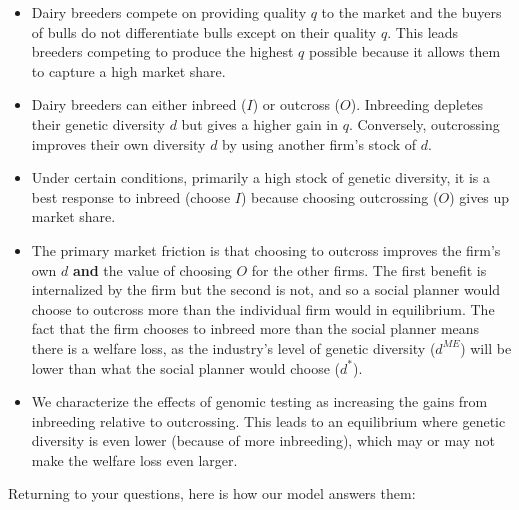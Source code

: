 \documentclass[12pt,letterpaper]{article}
\begin{document}
\begin{itemize}
\item Dairy breeders compete on providing quality $q$ to the market and the buyers of bulls do not differentiate bulls except on their quality $q$. This leads breeders competing to produce the highest $q$ possible because it allows them to capture a high market share.
\item Dairy breeders can either inbreed ($I$) or outcross ($O$). Inbreeding depletes their genetic diversity $d$ but gives a higher gain in $q$. Conversely, outcrossing improves their own diversity $d$ by using another firm's stock of $d$.
\item Under certain conditions, primarily a high stock of genetic diversity, it is a best response to inbreed (choose $I$) because choosing outcrossing ($O$) gives up market share.
\item The primary market friction is that choosing to outcross improves the firm's own $d$ \textbf{and} the value of choosing $O$ for the other firms. The first benefit is internalized by the firm but the second is not, and so a social planner would choose to outcross more than the individual firm would in equilibrium. The fact that the firm chooses to inbreed more than the social planner means there is a welfare loss, as the industry's level of genetic diversity ($d^{ME}$) will be lower than what the social planner would choose ($d^*$).
\item We characterize the effects of genomic testing as increasing the gains from inbreeding relative to outcrossing. This leads to an equilibrium where genetic diversity is even lower (because of more inbreeding), which may or may not make the welfare loss even larger.
\end{itemize}

Returning to your questions, here is how our model answers them:
\end{document}
